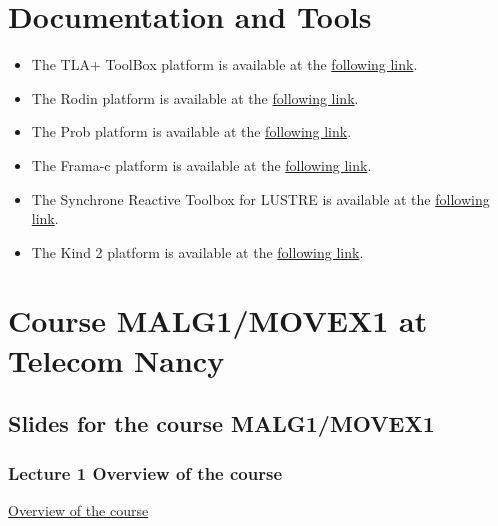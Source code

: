 \documentclass[ 12pt]{article}
\begin{document}
\tableofcontents


\section{Documentation and Tools}

\begin{itemize}

    
\item[]  The  TLA+ ToolBox  platform is available at the 
  \href{https://lamport.azurewebsites.net/tla/toolbox.html}{following 
    link}. 
\item[]  The Rodin platform is available at the 
  \href{https://www.event-b.org/install.html}{following 
    link}.

  
  \item[]  The Prob   platform is available at the 
  \href{https://prob.hhu.de}{following 
    link}. 

  
  \item[]  The Frama-c platform is available at the 
  \href{https://www.frama-c.com}{following 
    link}.

  \item[]  The Synchrone Reactive Toolbox for LUSTRE is   available at the 
  \href{https://www-verimag.imag.fr/Outils-SynchronesNEW.html?lang=en}{following 
    link}.

  \item[]  The Kind 2  platform is available at the 
  \href{ https://kind2-mc.github.io/kind2/}{following 
    link}.

  
\end{itemize}




\section{Course MALG1/MOVEX1 at Telecom Nancy}
\label{sec:course-mcfsi-at}


\subsection{Slides for the course MALG1/MOVEX1}
\label{sec:slides}


\subsubsection{Lecture 1 {Overview of the course }}
  
  \href{http://mery54.github.io/teaching/movex/lecturesnotes/movexlecture0.pdf}{Overview of the course }
\end{document}

